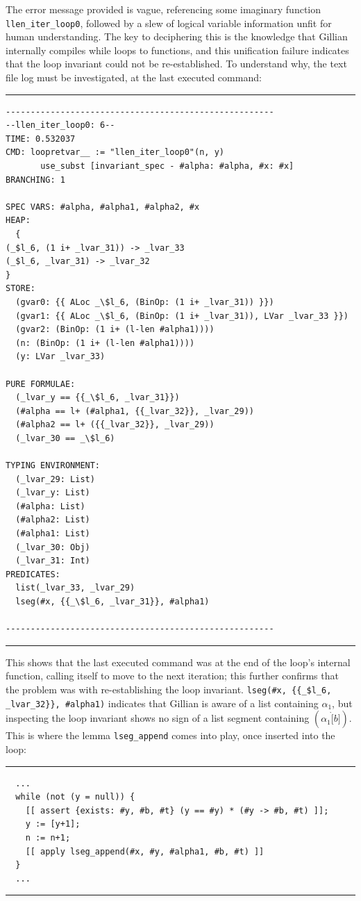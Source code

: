 The error message provided is vague, referencing some imaginary function
\texttt{llen\_iter\_loop0}, followed by a slew of logical variable information
unfit for human understanding. The key to deciphering this is the knowledge that
Gillian internally compiles while loops to functions, and this unification
failure indicates that the loop invariant could not be re-established. To
understand why, the text file log must be investigated, at the last executed
command:
\noindent\rule{\textwidth}{0.5pt}
\vspace{-0.6cm}
\begin{verbatim}
------------------------------------------------------
--llen_iter_loop0: 6--
TIME: 0.532037
CMD: loopretvar__ := "llen_iter_loop0"(n, y) 
       use_subst [invariant_spec - #alpha: #alpha, #x: #x]
BRANCHING: 1

SPEC VARS: #alpha, #alpha1, #alpha2, #x
HEAP:
  {
(_$l_6, (1 i+ _lvar_31)) -> _lvar_33
(_$l_6, _lvar_31) -> _lvar_32
}
STORE:
  (gvar0: {{ ALoc _\$l_6, (BinOp: (1 i+ _lvar_31)) }})
  (gvar1: {{ ALoc _\$l_6, (BinOp: (1 i+ _lvar_31)), LVar _lvar_33 }})
  (gvar2: (BinOp: (1 i+ (l-len #alpha1))))
  (n: (BinOp: (1 i+ (l-len #alpha1))))
  (y: LVar _lvar_33)

PURE FORMULAE:
  (_lvar_y == {{_\$l_6, _lvar_31}})
  (#alpha == l+ (#alpha1, {{_lvar_32}}, _lvar_29))
  (#alpha2 == l+ ({{_lvar_32}}, _lvar_29))
  (_lvar_30 == _\$l_6)

TYPING ENVIRONMENT:
  (_lvar_29: List)
  (_lvar_y: List)
  (#alpha: List)
  (#alpha2: List)
  (#alpha1: List)
  (_lvar_30: Obj)
  (_lvar_31: Int)
PREDICATES:
  list(_lvar_33, _lvar_29)
  lseg(#x, {{_\$l_6, _lvar_31}}, #alpha1)

------------------------------------------------------
\end{verbatim}
\vspace{-0.4cm}
\noindent\rule{\textwidth}{0.5pt}
\vspace{-0.6cm}
\vspace{0.5cm}


This shows that the last executed command was at the end of the loop's internal
function, calling itself to move to the next iteration; this further confirms
that the problem was with re-establishing the loop invariant.
\texttt{lseg(\#x, \{\{\_\$l\_6, \_lvar\_32\}\}, \#alpha1)} indicates that
Gillian is aware of a list containing $\alpha_1$, but inspecting the loop
invariant shows no sign of a list segment containing $(\alpha_1 \dot [b])$. This
is where the lemma \texttt{lseg\_append} comes into play, once inserted into
the loop:
\noindent\rule{\textwidth}{0.5pt}
\vspace{-0.6cm}
\begin{verbatim}
  ...
  while (not (y = null)) {
    [[ assert {exists: #y, #b, #t} (y == #y) * (#y -> #b, #t) ]];
    y := [y+1];
    n := n+1;
    [[ apply lseg_append(#x, #y, #alpha1, #b, #t) ]]
  }
  ...
\end{verbatim}
\vspace{-0.4cm}
\noindent\rule{\textwidth}{0.5pt}
\vspace{-0.6cm}
\vspace{0.5cm}

